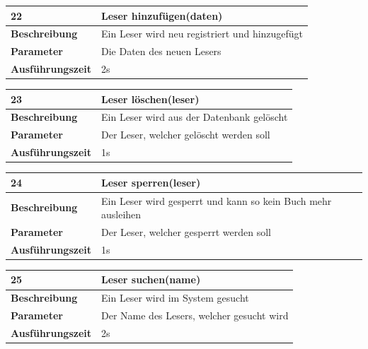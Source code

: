 \documentclass[fontsize=12pt,paper=a4,twoside]{scrartcl}
\begin{document}
  \begin{table}[htbp]
  \label{a22}
  \begin{tabular}{|l|p{10cm}|}
  \hline 
  \textbf{22} & \textbf{Leser hinzufügen(daten)} \\ \hline
  \textbf{Beschreibung} & Ein Leser wird neu registriert und hinzugefügt\\ \hline
  \textbf{Parameter} & Die Daten des neuen Lesers \\ \hline
  \textbf{Ausführungszeit} & 2s\\ \hline
  \end{tabular}
  \end{table}


  \begin{table}[htbp]
  \label{a23}
  \begin{tabular}{|l|p{10cm}|}
  \hline 
  \textbf{23} & \textbf{Leser löschen(leser)} \\ \hline
  \textbf{Beschreibung} & Ein Leser wird aus der Datenbank gelöscht\\ \hline
  \textbf{Parameter} & Der Leser, welcher gelöscht werden soll \\ \hline
  \textbf{Ausführungszeit} & 1s\\ \hline
  \end{tabular}
  \end{table}

  \begin{table}[htbp]
  \label{a24}
  \begin{tabular}{|l|p{10cm}|}
  \hline 
  \textbf{24} & \textbf{Leser sperren(leser)} \\ \hline
  \textbf{Beschreibung} & Ein Leser wird gesperrt und kann so kein Buch mehr ausleihen\\ \hline
  \textbf{Parameter} & Der Leser, welcher gesperrt werden soll \\ \hline
  \textbf{Ausführungszeit} & 1s\\ \hline
  \end{tabular}
  \end{table}

  \begin{table}[htbp]
  \label{a25}
  \begin{tabular}{|l|p{10cm}|}
  \hline 
  \textbf{25} & \textbf{Leser suchen(name)} \\ \hline
  \textbf{Beschreibung} & Ein Leser wird im System gesucht\\ \hline
  \textbf{Parameter} & Der Name des Lesers, welcher gesucht wird \\ \hline
  \textbf{Ausführungszeit} & 2s\\ \hline
  \end{tabular}
  \end{table}
\end{document}
